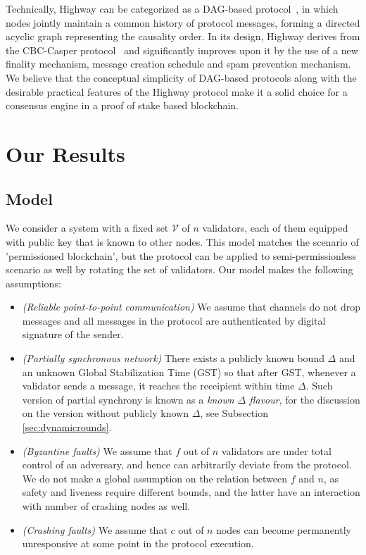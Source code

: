 \documentclass[12pt, fleqn]{article}
\begin{document}
Technically, Highway can be categorized as a DAG-based protocol~\cite{moser1999byzantine,zamfir2018casper,baird2016hashgraph,GLSS19}, in which nodes jointly maintain a common history of protocol messages, forming a directed acyclic graph representing the causality order.
%
In its design, Highway derives from the CBC-Casper protocol~\cite{zamfir2018casper} and significantly improves upon it by the use of a new finality mechanism, message creation schedule and spam prevention mechanism.
%
We believe that the conceptual simplicity of DAG-based protocols along with the desirable practical features of the Highway protocol make it a solid choice for a consensus engine in a proof of stake based blockchain. 




\section{Our Results}

\subsection{Model}

We consider a system with a fixed set $\mathcal{V}$ of $n$ validators, each of them equipped with public key that is known to other nodes.
This model matches the scenario of 'permissioned blockchain', but the protocol can be applied to semi-permissionless scenario as well by rotating the set of validators.
Our model makes the following assumptions:
\begin{itemize}
    \item\emph{(Reliable point-to-point communication)}
    We assume that channels do not drop messages and all messages in the protocol are authenticated by digital signature of the sender.
    \item\emph{(Partially synchronous network)} There exists a publicly known bound $\Delta$ and an unknown Global Stabilization Time (GST) so that after GST, whenever a validator sends a message, it reaches the receipient within time $\Delta$. Such version of partial synchrony is known as a \emph{known $\Delta$ flavour}, for the discussion on the version without publicly known $\Delta$, see Subsection \ref{sec:dynamicrounds}.
    \item\emph{(Byzantine faults)} We assume that $f$ out of $n$ validators are under total control of an adversary, and hence can arbitrarily deviate from the protocol. We do not make a global assumption on the relation between $f$ and $n$, as safety and liveness require different bounds, and the latter have an interaction with number of crashing nodes as well.
    \item\emph{(Crashing faults)} We assume that $c$ out of $n$ nodes can become permanently unresponsive at some point in the protocol execution.
\end{itemize}
\end{document}
